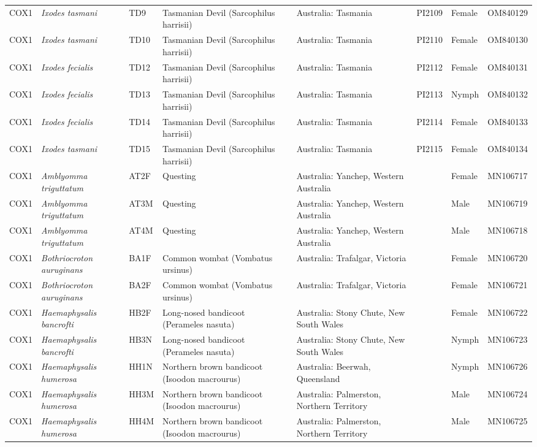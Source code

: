 \documentclass[a4paper, nobind]{templates/ociamthesis}
\begin{document}
\begin{landscape}
\begin{longtable}[t]{l>{}lllllll}
COX1 & \em{Ixodes tasmani} & TD9 & Tasmanian Devil (Sarcophilus harrisii) & Australia: Tasmania & PI2109 & Female & OM840129\\
COX1 & \em{Ixodes tasmani} & TD10 & Tasmanian Devil (Sarcophilus harrisii) & Australia: Tasmania & PI2110 & Female & OM840130\\
COX1 & \em{Ixodes fecialis} & TD12 & Tasmanian Devil (Sarcophilus harrisii) & Australia: Tasmania & PI2112 & Female & OM840131\\
COX1 & \em{Ixodes fecialis} & TD13 & Tasmanian Devil (Sarcophilus harrisii) & Australia: Tasmania & PI2113 & Nymph & OM840132\\
COX1 & \em{Ixodes fecialis} & TD14 & Tasmanian Devil (Sarcophilus harrisii) & Australia: Tasmania & PI2114 & Female & OM840133\\
COX1 & \em{Ixodes tasmani} & TD15 & Tasmanian Devil (Sarcophilus harrisii) & Australia: Tasmania & PI2115 & Female & OM840134\\
COX1 & \em{Amblyomma triguttatum} & AT2F & Questing & Australia: Yanchep, Western Australia &  & Female & MN106717\\
COX1 & \em{Amblyomma triguttatum} & AT3M & Questing & Australia: Yanchep, Western Australia &  & Male & MN106719\\
COX1 & \em{Amblyomma triguttatum} & AT4M & Questing & Australia: Yanchep, Western Australia &  & Male & MN106718\\
COX1 & \em{Bothriocroton auruginans} & BA1F & Common wombat (Vombatus ursinus) & Australia: Trafalgar, Victoria &  & Female & MN106720\\
COX1 & \em{Bothriocroton auruginans} & BA2F & Common wombat (Vombatus ursinus) & Australia: Trafalgar, Victoria &  & Female & MN106721\\
COX1 & \em{Haemaphysalis bancrofti} & HB2F & Long-nosed bandicoot (Perameles nasuta) & Australia: Stony Chute, New South Wales &  & Female & MN106722\\
COX1 & \em{Haemaphysalis bancrofti} & HB3N & Long-nosed bandicoot (Perameles nasuta) & Australia: Stony Chute, New South Wales &  & Nymph & MN106723\\
COX1 & \em{Haemaphysalis humerosa} & HH1N & Northern brown bandicoot (Isoodon macrourus) & Australia: Beerwah, Queensland &  & Nymph & MN106726\\
COX1 & \em{Haemaphysalis humerosa} & HH3M & Northern brown bandicoot (Isoodon macrourus) & Australia: Palmerston, Northern Territory &  & Male & MN106724\\
COX1 & \em{Haemaphysalis humerosa} & HH4M & Northern brown bandicoot (Isoodon macrourus) & Australia: Palmerston, Northern Territory &  & Male & MN106725\\

\end{longtable}
\end{landscape}
\end{document}
